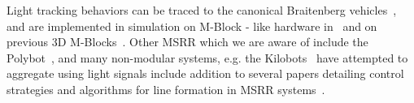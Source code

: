 Light tracking behaviors can be traced to the canonical Braitenberg vehicles~\cite{braitenberg1986vehicles}, and are implemented in simulation on M-Block - like hardware in~\cite{sclaicithesis2016} and on previous 3D M-Blocks~\cite{claici2017distributed}. Other MSRR which we are aware of include the Polybot~\cite{Yim-IROS07}, and many non-modular systems, e.g. the Kilobots~\cite{Rubenstein-ICRA12} have attempted to aggregate using light signals include addition to several papers detailing control strategies and algorithms for line formation in MSRR systems~\cite{claici2017distributed, sclaicithesis2016}.


%
